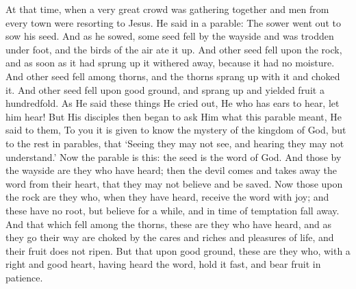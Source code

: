 {{At that time, when a very great crowd was gathering together and men from every town were resorting to Jesus. He said in a parable: The sower went out to sow his seed. And as he sowed, some seed fell by the wayside and was trodden under foot, and the birds of the air ate it up. And other seed fell upon the rock, and as soon as it had sprung up it withered away, because it had no moisture. And other seed fell among thorns, and the thorns sprang up with it and choked it. And other seed fell upon good ground, and sprang up and yielded fruit a hundredfold. As He said these things He cried out, He who has ears to hear, let him hear! But His disciples then began to ask Him what this parable meant, He said to them, To you it is given to know the mystery of the kingdom of God, but to the rest in parables, that ‘Seeing they may not see, and hearing they may not understand.’ Now the parable is this: the seed is the word of God. And those by the wayside are they who have heard; then the devil comes and takes away the word from their heart, that they may not believe and be saved. Now those upon the rock are they who, when they have heard, receive the word with joy; and these have no root, but believe for a while, and in time of temptation fall away. And that which fell among the thorns, these are they who have heard, and as they go their way are choked by the cares and riches and pleasures of life, and their fruit does not ripen. But that upon good ground, these are they who, with a right and good heart, having heard the word, hold it fast, and bear fruit in patience.
  }
}
\newcommand{\offertory}{%
  Pérfice gressus meos in sémitis tuis, ut non moveántur vestígia mea: inclína aurem tuam, et exáudi verba mea: mirífica misericórdias tuas, qui salvos facis sperántes in te, Dómine.
}
\newcommand{\offertoryTranslation}{%
  Make my steps steadfast in Your paths, that my feet may not falter. Incline Your ear to me; hear my word. Show Your wondrous kindness, O Lord, Saviour of those who trust in You.
}
\newcommand{\secret}{%
  \l{%
    Oblátum tibi, Dómine, sacrifícium, vivíficet nos semper et múniat.
  }
  \e{%
    May this sacrifice which we offer You, O Lord, ever give us new life and protection.
  }
  \perDominum
}
\newcommand{\communion}{%
  Introíbo ad altáre Dei, ad Deum, qui lætíficat iuventútem meam.
}
\newcommand{\communionTranslation}{%
  I will go in to the altar of God, the God of my gladness and joy.
}
\newcommand{\postcommunion}{%
  \l{%
    Súpplices te rogámus, omnípotens Deus: ut, quos tuis réficis sacraméntis, tibi étiam plácitis móribus dignánter deservíre concédas.
  }
  \e{%
    O almighty God, grant, we humbly beseech You, that those whom You refresh with Your sacrament may also worthily serve You in a way that is well pleasing to You.
  }
  \perDominum
}

